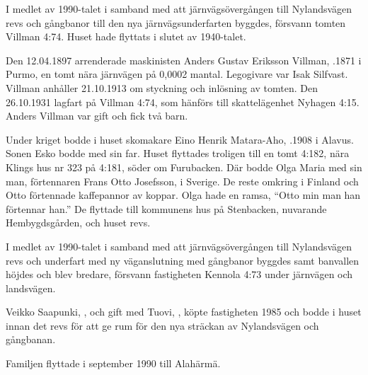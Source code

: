 

I medlet av 1990-talet i samband med att järnvägsövergången till Nylandsvägen revs och gångbanor till den nya järnvägsunderfarten	byggdes, försvann tomten Villman 4:74. Huset hade flyttats i slutet av 1940-talet.


Den 12.04.1897 arrenderade maskinisten Anders Gustav Eriksson Villman, .1871 i Purmo, en tomt nära järnvägen på 0,0002	mantal. Legogivare var Isak Silfvast. Villman anhåller 21.10.1913 om styckning och inlösning av tomten. Den 26.10.1931 lagfart på Villman	4:74, som hänförs till skattelägenhet Nyhagen 4:15. Anders Villman var gift och fick två barn.
\begin{jhchildren}
  \item {}
  \item {}
\end{jhchildren}
Under kriget bodde i huset skomakare Eino Henrik Matara-Aho, .1908 i Alavus. Sonen Esko bodde med sin far.
Huset flyttades troligen till en tomt 4:182, nära Klings hus nr 323 på 4:181, söder om Furubacken. Där bodde Olga Maria med sin man, förtennaren Frans Otto Josefsson,  i Sverige. De reste omkring i Finland och Otto förtennade kaffepannor av koppar. Olga hade en ramsa, ``Otto min man han förtennar han.'' De flyttade till kommunens hus på Stenbacken, nuvarande Hembygdsgården, och huset revs.






I medlet av 1990-talet i samband med att järnvägsövergången till Nylandsvägen revs och underfart med ny väganslutning med gångbanor byggdes samt banvallen höjdes och blev bredare, försvann fastigheten Kennola 4:73 under järnvägen och landsvägen.


Veikko Saapunki, , och gift med Tuovi, , köpte fastigheten 1985 och bodde i huset innan det revs för att ge rum för den nya sträckan av Nylandsvägen och gångbanan.
\begin{jhchildren}
  \item {}
  \item {}
\end{jhchildren}
Familjen flyttade i september 1990 till Alahärmä.


